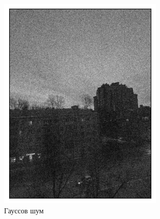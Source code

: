 \documentclass[a4paper,12pt]{article}
\begin{document}
\begin{figure}[H]
    \begin{minipage}{0.49\textwidth}
        \centering \includegraphics[width=\textwidth]{results/gaus.png}
        \caption{Гауссов шум}
    \end{minipage}\hfill
    \begin{minipage}{0.49\textwidth}

\end{minipage}
\end{figure}
\end{document}
